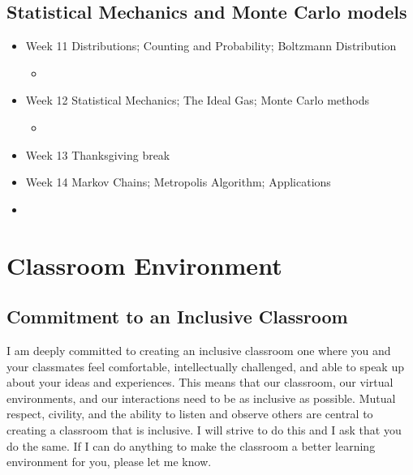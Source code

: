 \documentclass[letterpaper,10pt,english]{jupyterBook}
\begin{document}
\subsection{Statistical Mechanics and Monte Carlo models}
\label{\detokenize{content/0_course/5_calendar:statistical-mechanics-and-monte-carlo-models}}\begin{itemize}
\item {} 
\sphinxAtStartPar
Week 11 \sphinxhyphen{} Distributions; Counting and Probability; Boltzmann Distribution
\begin{itemize}
\item {} 
\sphinxAtStartPar
{}

\end{itemize}

\item {} 
\sphinxAtStartPar
Week 12 \sphinxhyphen{} Statistical Mechanics; The Ideal Gas; Monte Carlo methods
\begin{itemize}
\item {} 
\sphinxAtStartPar
{}

\end{itemize}

\item {} 
\sphinxAtStartPar
Week 13 \sphinxhyphen{} Thanksgiving break

\item {} 
\sphinxAtStartPar
Week 14 \sphinxhyphen{} Markov Chains; Metropolis Algorithm; Applications

\item {} 
\sphinxAtStartPar
{}

\end{itemize}

\sphinxstepscope


\section{Classroom Environment}
\label{\detokenize{content/0_course/6_environment:classroom-environment}}\label{\detokenize{content/0_course/6_environment::doc}}

\subsection{Commitment to an Inclusive Classroom}
\label{\detokenize{content/0_course/6_environment:commitment-to-an-inclusive-classroom}}
\sphinxAtStartPar
I am deeply committed to creating an inclusive classroom \sphinxhyphen{} one where you and your classmates
feel comfortable, intellectually challenged, and able to speak up about your ideas
and experiences. This means that our classroom, our virtual environments, and our interactions
need to be as inclusive as possible. Mutual respect, civility, and the ability to listen
and observe others are central to creating a classroom that is inclusive. I will strive to
do this and I ask that you do the same. If I can do anything to make the classroom a better
learning environment for you, please let me know.
\end{document}
